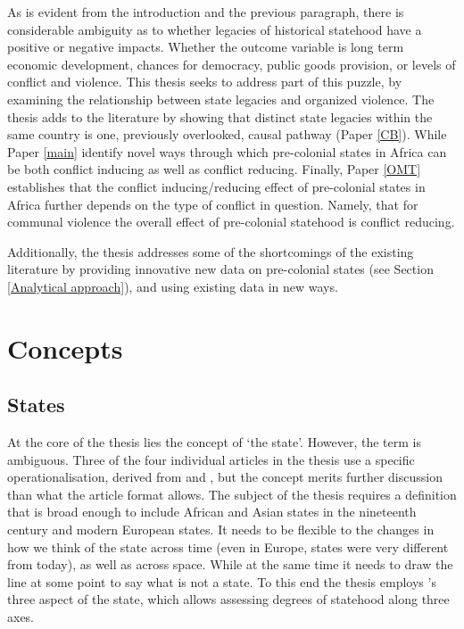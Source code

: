 As is evident from the introduction and the previous paragraph, there is
considerable ambiguity as to whether legacies of historical statehood have a
positive or negative impacts. Whether the outcome variable is long term economic
development, chances for democracy, public goods provision, or levels of
conflict and violence. This thesis seeks to address part of this puzzle, by
examining the relationship between state legacies and organized violence. The
thesis adds to the literature by showing that \citet{multiple} distinct state
legacies within the same country is one, previously overlooked, causal pathway
(Paper \ref{CB}). While Paper \ref{main} identify novel ways through which
pre-colonial states in Africa can be both conflict inducing as well as conflict
reducing. Finally, Paper \ref{OMT} establishes that the conflict
inducing/reducing effect of pre-colonial states in Africa further depends on the
type of conflict in question. Namely, that for communal violence the overall
effect of pre-colonial statehood is conflict reducing.

Additionally, the thesis addresses some of the shortcomings of the existing
literature by providing innovative new data on pre-colonial states (see Section
\ref{Analytical approach}), and using existing data in new ways.

\section{Concepts} \label{Concepts}

\subsection{States} \label{States}

At the core of the thesis lies the concept of `the state'. However, the term is
ambiguous. Three of the four individual articles in the thesis use a specific
operationalisation, derived from \citet{Butcher2019} and \citet{Butcher2017},
but the concept merits further discussion than what the article format allows.
The subject of the thesis requires a definition that is broad enough to include
African and Asian states in the nineteenth century and modern European states.
It needs to be flexible to the changes in how we think of the state across time
(even in Europe, states were very different from today), as well as across
space. While at the same time it needs to draw the line at some point to say
what is not a state. To this end the thesis employs \citet{Clapham1996}'s three
aspect of the state, which allows assessing degrees of statehood along three
axes.

